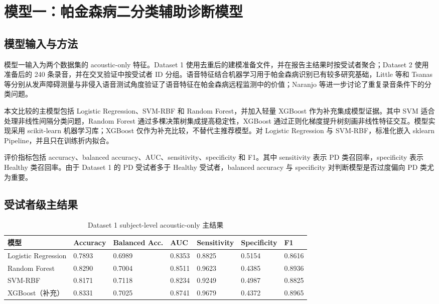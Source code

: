 \section{模型一：帕金森病二分类辅助诊断模型}

\subsection{模型输入与方法}

模型一输入为两个数据集的 acoustic-only 特征。Dataset 1 使用去重后的建模准备文件，并在报告主结果时按受试者聚合；Dataset 2 使用准备后的 240 条录音，并在交叉验证中按受试者 ID 分组。语音特征结合机器学习用于帕金森病识别已有较多研究基础，Little 等和 Tsanas 等分别从发声障碍测量与非侵入语音测试角度验证了语音特征在帕金森病远程监测中的价值；Naranjo 等进一步讨论了重复录音条件下的分类问题。

本文比较的主模型包括 Logistic Regression、SVM-RBF 和 Random Forest，并加入轻量 XGBoost 作为补充集成模型证据。其中 SVM 适合处理非线性间隔分类问题，Random Forest 通过多棵决策树集成提高稳定性，XGBoost 通过正则化梯度提升树刻画非线性特征交互。模型实现采用 scikit-learn 机器学习库；XGBoost 仅作为补充比较，不替代主推荐模型。对 Logistic Regression 与 SVM-RBF，标准化嵌入 sklearn Pipeline，并且只在训练折内拟合。

评价指标包括 accuracy、balanced accuracy、AUC、sensitivity、specificity 和 F1。其中 sensitivity 表示 PD 类召回率，specificity 表示 Healthy 类召回率。由于 Dataset 1 的 PD 受试者多于 Healthy 受试者，balanced accuracy 与 specificity 对判断模型是否过度偏向 PD 类尤为重要。

\subsection{受试者级主结果}

\begin{table}[H]
\centering
\caption{Dataset 1 subject-level acoustic-only 主结果}
\small
\begin{tabularx}{\textwidth}{lYYYYYY}
\toprule
模型 & Accuracy & Balanced Acc. & AUC & Sensitivity & Specificity & F1 \\
\midrule
Logistic Regression & 0.7893 & 0.6989 & 0.8353 & 0.8825 & 0.5154 & 0.8616 \\
Random Forest & 0.8290 & 0.7004 & 0.8511 & 0.9623 & 0.4385 & 0.8936 \\
SVM-RBF & 0.8171 & 0.7118 & 0.8234 & 0.9249 & 0.4987 & 0.8825 \\
XGBoost（补充） & 0.8331 & 0.7025 & 0.8741 & 0.9679 & 0.4372 & 0.8965 \\
\bottomrule
\end{tabularx}
\end{table}

